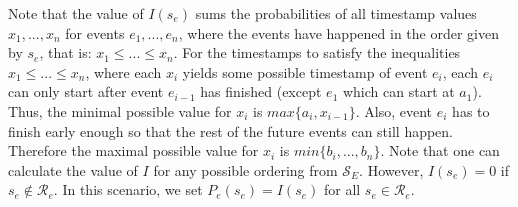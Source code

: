 \begin{itemize}
Note that the value of $I(s_e)$ sums the probabilities of all timestamp values $x_1,...,x_n$ for events $e_1,...,e_n$, where the events have happened in the order given by $s_e$, that is: $x_1 \leq ... \leq x_n$.
For the timestamps to satisfy the inequalities $x_1 \leq  ...  \leq x_n$, where each $x_i$ yields some possible timestamp of event $e_i$, each $e_i$ can only start after event $e_{i-1}$ has finished (except $e_1$ which can start at $a_1$).
Thus, the minimal possible value for $x_i$ is $max\{a_i,x_{i-1}\}$.
Also, event $e_i$ has to finish early enough so that the rest of the future events can still happen.
Therefore the maximal possible value for $x_i$ is $min\{b_i,...,b_n\}$.
Note that one can calculate the value of $I$ for any possible ordering from $\mathcal{S}_E$.
However, $I(s_e)=0$ if $s_e \not \in \mathcal{R}_e$.
In this scenario, we set $P_e(s_e)= I(s_e)$ for all $s_e \in \mathcal{R}_e$.


\end{itemize}
